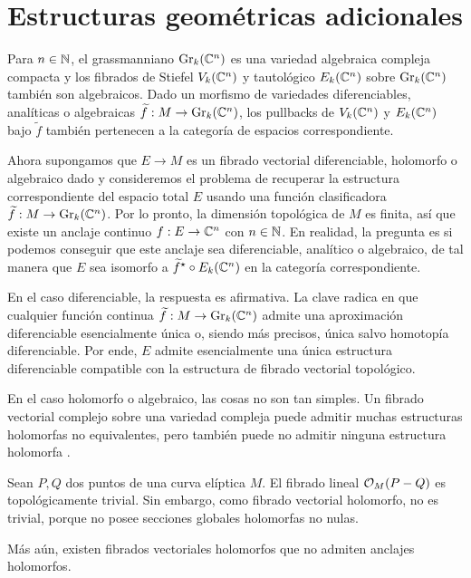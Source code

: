 \section{Estructuras geométricas adicionales}

Para $n \in \mathbb N$, el grassmanniano $\operatorname{Gr}_k(\mathbb C^n)$ es una variedad algebraica compleja compacta y los fibrados de Stiefel $V_k(\mathbb C^n)$ y tautológico $E_k(\mathbb C^n)$ sobre $\operatorname{Gr}_k(\mathbb C^n)$ también son algebraicos. Dado un morfismo de variedades diferenciables, analíticas o algebraicas $\widetilde f : M \to \operatorname{Gr}_k(\mathbb C^n)$, los pullbacks de $V_k(\mathbb C^n)$ y $E_k(\mathbb C^n)$ bajo $\widetilde f$ también pertenecen a la categoría de espacios correspondiente.

Ahora supongamos que $E \to M$ es un fibrado vectorial diferenciable, holomorfo o algebraico dado y consideremos el problema de recuperar la estructura correspondiente del espacio total $E$ usando una función clasificadora $\widetilde f : M \to \operatorname{Gr}_k(\mathbb C^n)$. Por lo pronto, la dimensión topológica de $M$ es finita, así que existe un anclaje continuo $f : E \to \mathbb C^n$ con $n \in \mathbb N$. En realidad, la pregunta es si podemos conseguir que este anclaje sea diferenciable, analítico o algebraico, de tal manera que $E$ sea isomorfo a $\widetilde f^\star \circ E_k(\mathbb C^n)$ en la categoría correspondiente.

En el caso diferenciable, la respuesta es afirmativa. La clave radica en que cualquier función continua $\widetilde f : M \to \operatorname{Gr}_k(\mathbb C^n)$ admite una aproximación diferenciable esencialmente única o, siendo más precisos, única salvo homotopía diferenciable. Por ende, $E$ admite esencialmente una única estructura diferenciable compatible con la estructura de fibrado vectorial topológico.

En el caso holomorfo o algebraico, las cosas no son tan simples. Un fibrado vectorial complejo sobre una variedad compleja puede admitir muchas estructuras holomorfas no equivalentes, pero también puede no admitir ninguna estructura holomorfa \cite[pp. 66-67]{huybrechts}.

\begin{example}
Sean $P, Q$ dos puntos de una curva elíptica $M$. El fibrado lineal $\mathcal O_M(P-Q)$ es topológicamente trivial. Sin embargo, como fibrado vectorial holomorfo, no es trivial, porque no posee secciones globales holomorfas no nulas.
\end{example}

Más aún, existen fibrados vectoriales holomorfos que no admiten anclajes holomorfos.


